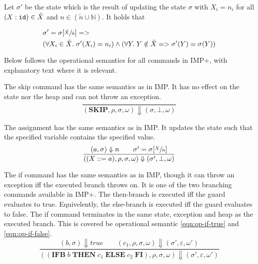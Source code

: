 \begin{defn}\label{def:state-list-update}
Let $\sigma'$ be the state which is the result of updating the state $\sigma$ with $X_i = n_i$ for all $(X : \verb|id|) \in \tilde{X}$ and $n \in (\tilde{n} \cup \mathbb{N})$. It holds that

\begin{equation}
\begin{split}
&\sigma' = \sigma[\sfrac{\tilde{X}}{\tilde{n}}] =>\\
&(\forall X_i \in \tilde{X}.\; \sigma'(X_i) = n_i) \wedge (\forall Y.\; Y \notin \tilde{X} => \sigma'(Y) = \sigma(Y))
\end{split}
\end{equation}
\end{defn}

Below follows the operational semantics for all commands in IMP+, with explanatory text where it is relevant.

The skip command has the same semantics as in IMP. It has no effect on the state nor the heap and can not throw an exception.
\begin{equation}
\frac{}{(\textbf{SKIP}, \rho, \sigma, \omega) \Downarrow (\sigma, \bot, \omega)}
\end{equation}

The assignment has the same semantics as in IMP. It updates the state such that the specified variable contains the specified value.
\begin{equation}\label{eqn:op-assign}
\frac{(a, \sigma) \Downarrow n \qquad \sigma' = \sigma[\sfrac{X}{n}]}{((X ::= a), \rho, \sigma, \omega) \Downarrow (\sigma', \bot, \omega)}
\end{equation}

The if command has the same semantics as in IMP, though it can throw an exception iff the executed branch throws on. It is one of the two branching commands available in IMP+. The then-branch is executed iff the guard evaluates to true. Equivelently, the else-branch is executed iff the guard evaluates to false. The if command terminates in the same state, exception and heap as the executed branch. This is covered be operational semantic \ref{eqn:op-if-true} and \ref{eqn:op-if-false}.
\begin{equation}\label{eqn:op-if-true}
\frac{(b, \sigma) \Downarrow true \qquad (c_1, \rho, \sigma, \omega) \Downarrow (\sigma', \varepsilon, \omega')}{((\textbf{IFB}\; b\; \textbf{THEN}\; c_1\; \textbf{ELSE}\; c_2\; \textbf{FI}), \rho, \sigma, \omega) \Downarrow (\sigma', \varepsilon, \omega')}
\end{equation}

